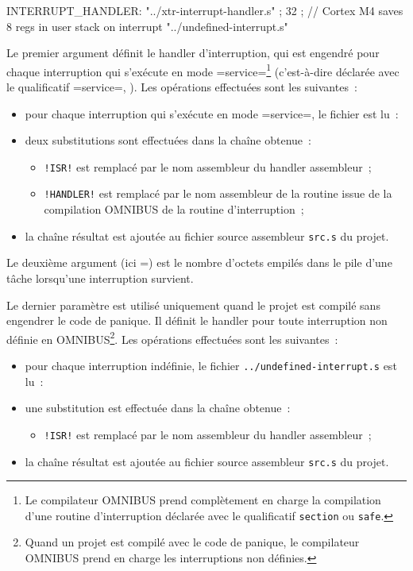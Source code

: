\begin{OMNIBUS}
INTERRUPT_HANDLER:
  "../xtr-interrupt-handler.s" ;
  32 ; // Cortex M4 saves 8 regs in user stack on interrupt
  "../undefined-interrupt.s"
\end{OMNIBUS}

Le premier argument définit le handler d'interruption, qui est engendré pour chaque interruption qui s'exécute en mode \omnibus=service=\footnote{Le compilateur OMNIBUS prend complètement en charge la compilation d'une routine d'interruption déclarée avec le qualificatif \texttt{section} ou  \texttt{safe}.} (c'est-à-dire déclarée avec le qualificatif \omnibus=service=, ). Les opérations effectuées sont les suivantes~:
\begin{itemize}
  \item pour chaque interruption qui s'exécute en mode \omnibus=service=, le fichier est lu~:
  \item deux substitutions sont effectuées dans la chaîne obtenue~:
  \begin{itemize}
    \item \texttt{!ISR!} est remplacé par le nom assembleur du handler assembleur~;
    \item \texttt{!HANDLER!} est remplacé par le nom assembleur de la routine issue de la compilation OMNIBUS de la routine d'interruption~;
  \end{itemize}
  \item la chaîne résultat est ajoutée au fichier source assembleur \texttt{src.s} du projet.
\end{itemize}



Le deuxième argument (ici =) est le nombre d'octets empilés dans le pile d'une tâche lorsqu'une interruption survient.



Le dernier paramètre est utilisé uniquement quand le projet est compilé sans engendrer le code de panique. Il définit le handler pour toute interruption non définie en OMNIBUS\footnote{Quand un projet est compilé avec le code de panique, le compilateur OMNIBUS prend en charge les interruptions non définies.}. Les opérations effectuées sont les suivantes~:
\begin{itemize}
  \item pour chaque interruption indéfinie, le fichier \texttt{../undefined-interrupt.s} est lu~:
  \item une substitution est effectuée dans la chaîne obtenue~:
  \begin{itemize}
    \item \texttt{!ISR!} est remplacé par le nom assembleur du handler assembleur~;
  \end{itemize}
  \item la chaîne résultat est ajoutée au fichier source assembleur \texttt{src.s} du projet.
\end{itemize}








